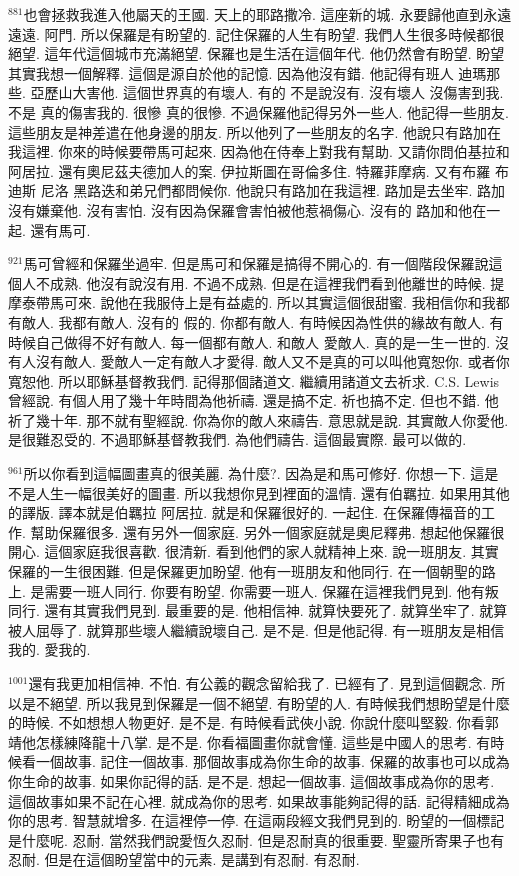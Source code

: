 \documentclass{book}
\begin{document}
$^{881}$也會拯救我進入他屬天的王國.
天上的耶路撒冷.
這座新的城.
永要歸他直到永遠遠遠.
阿門.
所以保羅是有盼望的.
記住保羅的人生有盼望.
我們人生很多時候都很絕望.
這年代這個城市充滿絕望.
保羅也是生活在這個年代.
他仍然會有盼望.
盼望其實我想一個解釋.
這個是源自於他的記憶.
因為他沒有錯.
他記得有班人 迪瑪那些.
亞歷山大害他.
這個世界真的有壞人.
有的 不是說沒有.
沒有壞人 沒傷害到我.
不是 真的傷害我的.
很慘 真的很慘.
不過保羅他記得另外一些人.
他記得一些朋友.
這些朋友是神差遣在他身邊的朋友.
所以他列了一些朋友的名字.
他說只有路加在我這裡.
你來的時候要帶馬可起來.
因為他在侍奉上對我有幫助.
又請你問伯基拉和阿居拉.
還有奧尼茲夫德加人的案.
伊拉斯圖在哥倫多住.
特羅菲摩病.
又有布羅 布迪斯 尼洛 黑路迭和弟兄們都問候你.
他說只有路加在我這裡.
路加是去坐牢.
路加沒有嫌棄他.
沒有害怕.
沒有因為保羅會害怕被他惹禍傷心.
沒有的 路加和他在一起.
還有馬可.

$^{921}$馬可曾經和保羅坐過牢.
但是馬可和保羅是搞得不開心的.
有一個階段保羅說這個人不成熟.
他沒有說沒有用.
不過不成熟.
但是在這裡我們看到他離世的時候.
提摩泰帶馬可來.
說他在我服侍上是有益處的.
所以其實這個很甜蜜.
我相信你和我都有敵人.
我都有敵人.
沒有的 假的.
你都有敵人.
有時候因為性供的緣故有敵人.
有時候自己做得不好有敵人.
每一個都有敵人.
和敵人 愛敵人.
真的是一生一世的.
沒有人沒有敵人.
愛敵人一定有敵人才愛得.
敵人又不是真的可以叫他寬恕你.
或者你寬恕他.
所以耶穌基督教我們.
記得那個諸道文.
繼續用諸道文去祈求.
C.S. Lewis曾經說.
有個人用了幾十年時間為他祈禱.
還是搞不定.
祈也搞不定.
但也不錯.
他祈了幾十年.
那不就有聖經說.
你為你的敵人來禱告.
意思就是說.
其實敵人你愛他.
是很難忍受的.
不過耶穌基督教我們.
為他們禱告.
這個最實際.
最可以做的.

$^{961}$所以你看到這幅圖畫真的很美麗.
為什麼?.
因為是和馬可修好.
你想一下.
這是不是人生一幅很美好的圖畫.
所以我想你見到裡面的溫情.
還有伯羈拉.
如果用其他的譯版.
譯本就是伯羈拉 阿居拉.
就是和保羅很好的.
一起住.
在保羅傳福音的工作.
幫助保羅很多.
還有另外一個家庭.
另外一個家庭就是奧尼釋弗.
想起他保羅很開心.
這個家庭我很喜歡.
很清新.
看到他們的家人就精神上來.
說一班朋友.
其實保羅的一生很困難.
但是保羅更加盼望.
他有一班朋友和他同行.
在一個朝聖的路上.
是需要一班人同行.
你要有盼望.
你需要一班人.
保羅在這裡我們見到.
他有叛同行.
還有其實我們見到.
最重要的是.
他相信神.
就算快要死了.
就算坐牢了.
就算被人屈辱了.
就算那些壞人繼續說壞自己.
是不是.
但是他記得.
有一班朋友是相信我的.
愛我的.

$^{1001}$還有我更加相信神.
不怕.
有公義的觀念留給我了.
已經有了.
見到這個觀念.
所以是不絕望.
所以我見到保羅是一個不絕望.
有盼望的人.
有時候我們想盼望是什麼的時候.
不如想想人物更好.
是不是.
有時候看武俠小說.
你說什麼叫堅毅.
你看郭靖他怎樣練降龍十八掌.
是不是.
你看福圖畫你就會懂.
這些是中國人的思考.
有時候看一個故事.
記住一個故事.
那個故事成為你生命的故事.
保羅的故事也可以成為你生命的故事.
如果你記得的話.
是不是.
想起一個故事.
這個故事成為你的思考.
這個故事如果不記在心裡.
就成為你的思考.
如果故事能夠記得的話.
記得精細成為你的思考.
智慧就增多.
在這裡停一停.
在這兩段經文我們見到的.
盼望的一個標記是什麼呢.
忍耐.
當然我們說愛恆久忍耐.
但是忍耐真的很重要.
聖靈所寄果子也有忍耐.
但是在這個盼望當中的元素.
是講到有忍耐.
有忍耐.
\end{document}
